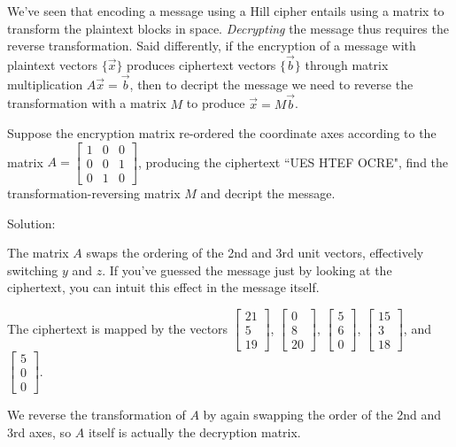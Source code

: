 \documentclass{ximera}
\begin{document}
We've seen that encoding a message using a Hill cipher entails using a matrix to transform the plaintext blocks in space. \emph{Decrypting} the message thus requires the reverse transformation. Said differently, if the encryption of a message with plaintext vectors $\lbrace \vec{x}\rbrace$ produces ciphertext vectors $\lbrace \vec{b}\rbrace$ through matrix multiplication $A\vec{x}=\vec{b}$, then to decript the message we need to reverse the transformation with a matrix $M$ to produce $\vec{x}=M\vec{b}$.

\begin{example}
  Suppose the encryption matrix re-ordered the coordinate axes according to the matrix $A=\begin{bmatrix}
    1&0&0\\0&0&1\\0&1&0
  \end{bmatrix}$, producing the ciphertext ``UES HTEF OCRE", find the transformation-reversing matrix $M$ and decript the message.


Solution:

  The matrix $A$ swaps the ordering of the 2nd and 3rd unit vectors, effectively switching $y$ and $z$. If you've guessed the message just by looking at the ciphertext, you can intuit this effect in the message itself.

  The ciphertext is mapped by the vectors $\begin{bmatrix}
    21 \\5\\19\end{bmatrix}$, $\begin{bmatrix}
    0 \\8\\20 \end{bmatrix}$, $\begin{bmatrix}
    5\\6\\0\end{bmatrix}$, $\begin{bmatrix}
    15\\3\\18\end{bmatrix}$, and $\begin{bmatrix}
    5\\0\\0\end{bmatrix}$.

  We reverse the transformation of $A$ by again swapping the order of the 2nd and 3rd axes, so $A$ itself is actually the decryption matrix.


\end{example}
\end{document}
